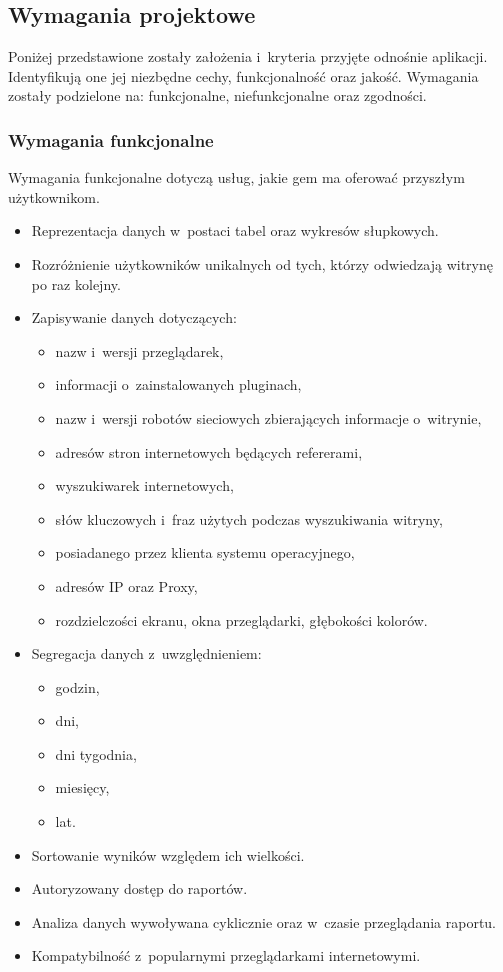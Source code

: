 \subsection{Wymagania projektowe}
Poniżej przedstawione zostały założenia i~kryteria przyjęte odnośnie aplikacji.
Identyfikują one jej niezbędne cechy, funkcjonalność oraz jakość.
Wymagania zostały podzielone na: funkcjonalne, niefunkcjonalne oraz zgodności.

\subsubsection{Wymagania funkcjonalne}
Wymagania funkcjonalne dotyczą usług, jakie gem ma oferować przyszłym użytkownikom.

\begin{itemize}
  \item Reprezentacja danych w~postaci tabel oraz wykresów słupkowych.
  \item Rozróżnienie użytkowników unikalnych od tych, którzy odwiedzają witrynę po raz kolejny.
  \item Zapisywanie danych dotyczących:
    \begin{itemize}
      \item nazw i~wersji przeglądarek,
      \item informacji o~zainstalowanych pluginach,
      \item nazw i~wersji robotów sieciowych zbierających informacje o~witrynie,
      \item adresów stron internetowych będących refererami,
      \item wyszukiwarek internetowych,
      \item słów kluczowych i~fraz użytych podczas wyszukiwania witryny,
      \item posiadanego przez klienta systemu operacyjnego,
      \item adresów IP oraz Proxy,
      \item rozdzielczości ekranu, okna przeglądarki, głębokości kolorów.
  \end{itemize}
  \item Segregacja danych z~uwzględnieniem:
    \begin{itemize}
      \item godzin,
      \item dni,
      \item dni tygodnia,
      \item miesięcy,
      \item lat.
    \end{itemize}
  \item Sortowanie wyników względem ich wielkości.
  \item Autoryzowany dostęp do raportów.
  \item Analiza danych wywoływana cyklicznie oraz w~czasie przeglądania raportu.
  \item Kompatybilność z~popularnymi przeglądarkami internetowymi.


\end{itemize}
